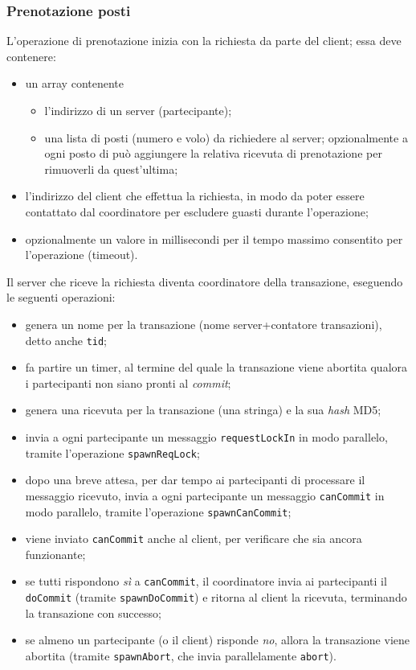 \documentclass[a4paper]{article}
\begin{document}
\subsubsection{Prenotazione posti}
L'operazione di prenotazione inizia con la richiesta da parte del client; essa deve contenere:
\begin{itemize}
	\item un array contenente
	\begin{itemize}
		\item l'indirizzo di un server (partecipante);
		\item una lista di posti (numero e volo) da richiedere al server; opzionalmente a ogni posto di può aggiungere la relativa ricevuta di prenotazione per rimuoverli da quest'ultima;
	\end{itemize}
	\item l'indirizzo del client che effettua la richiesta, in modo da poter essere contattato dal coordinatore per escludere guasti durante l'operazione;
	\item opzionalmente un valore in millisecondi per il tempo massimo consentito per l'operazione (timeout).
\end{itemize}

Il server che riceve la richiesta diventa coordinatore della transazione, eseguendo le seguenti operazioni:
\begin{itemize}
	\item genera un nome per la transazione (nome server+contatore transazioni), detto anche \texttt{tid};
	\item fa partire un timer, al termine del quale la transazione viene abortita qualora i partecipanti non siano pronti al \textit{commit};
	\item genera una ricevuta per la transazione (una stringa) e la sua \textit{hash} MD5;
	\item invia a ogni partecipante un messaggio \texttt{requestLockIn} in modo parallelo, tramite l'operazione \texttt{spawnReqLock};
	\item dopo una breve attesa, per dar tempo ai partecipanti di processare il messaggio ricevuto, invia a ogni partecipante un messaggio \texttt{canCommit} in modo parallelo, tramite l'operazione \texttt{spawnCanCommit};
	\item viene inviato \texttt{canCommit} anche al client, per verificare che sia ancora funzionante;
	\item se tutti rispondono \textit{sì} a \texttt{canCommit}, il coordinatore invia ai partecipanti il \texttt{doCommit} (tramite \texttt{spawnDoCommit}) e ritorna al client la ricevuta, terminando la transazione con successo;
	\item se almeno un partecipante (o il client) risponde \textit{no}, allora la transazione viene abortita (tramite \texttt{spawnAbort}, che invia parallelamente \texttt{abort}).
\end{itemize}
\end{document}
